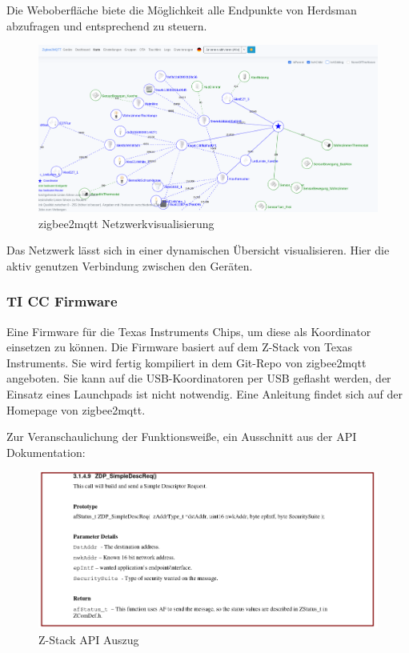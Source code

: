 Die Weboberfläche biete die Möglichkeit alle Endpunkte von Herdsman abzufragen und entsprechend zu steuern.

\begin{figure}[H]
  \centering
  \includegraphics[width=1\textwidth]{media/z2m-map.png}
  \caption{zigbee2mqtt Netzwerkvisualisierung}
\end{figure}

Das Netzwerk lässt sich in einer dynamischen Übersicht visualisieren. Hier die aktiv genutzen Verbindung zwischen den Geräten. 


\subsubsection{TI CC Firmware}

Eine Firmware für die Texas Instruments Chips, um diese als Koordinator einsetzen zu können. Die Firmware basiert auf dem Z-Stack von Texas Instruments. Sie wird fertig kompiliert
in dem Git-Repo von zigbee2mqtt angeboten. Sie kann auf die USB-Koordinatoren per USB geflasht werden, der Einsatz eines Launchpads ist nicht notwendig. Eine Anleitung
findet sich auf der Homepage von zigbee2mqtt.  


Zur Veranschaulichung der Funktionsweiße, ein Ausschnitt aus der API Dokumentation:

\begin{figure}[H]
  \centering
  \includegraphics[width=1\textwidth]{media/z-stack-api-excerpt.png}
  \caption{Z-Stack API Auszug}
\end{figure}


